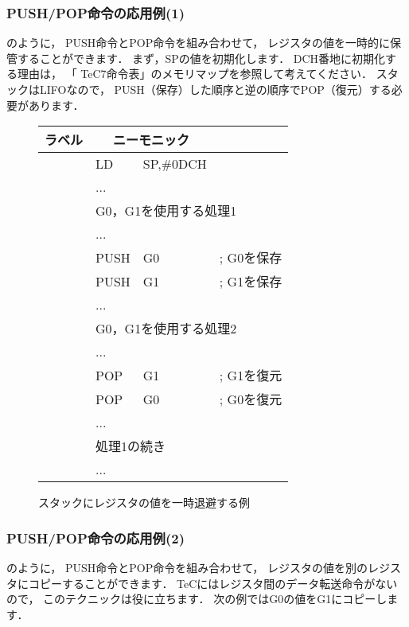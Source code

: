 \subsubsection{PUSH/POP命令の応用例(1)}
のように，
PUSH命令とPOP命令を組み合わせて，
レジスタの値を一時的に保管することができます．
まず，SPの値を初期化します．
DCH番地に初期化する理由は，
「 TeC7命令表」のメモリマップを参照して考えてください．
スタックはLIFOなので，
PUSH（保存）した順序と逆の順序でPOP（復元）する必要があります．

\begin{figure}[bt]
{\tt\small\begin{center}
\begin{tabular}{|l|l l l|}
\hline
ラベル & \multicolumn{2}{|c}{ニーモニック} & \\
\hline
    & LD   & SP,\#0DCH&            \\
    & ...  &          &            \\
    & \multicolumn{3}{|l|}{G0，G1を使用する処理1} \\
    & ...  &          &            \\
    & PUSH & G0       & ; G0を保存 \\
    & PUSH & G1       & ; G1を保存 \\
    & ...  &        & \\
    & \multicolumn{3}{|l|}{G0，G1を使用する処理2} \\
    & ...  &          &            \\
    & POP  & G1       & ; G1を復元 \\
    & POP  & G0       & ; G0を復元 \\
    & ...  &        & \\
    & \multicolumn{3}{|l|}{処理1の続き} \\
    & ...  &          &            \\
\hline
\end{tabular}
\end{center}}
\caption{スタックにレジスタの値を一時退避する例}
\label{fig:chap6:regsave}
\end{figure}

\subsubsection{PUSH/POP命令の応用例(2)}
のように，
PUSH命令とPOP命令を組み合わせて，
レジスタの値を別のレジスタにコピーすることができます．
TeCにはレジスタ間のデータ転送命令がないので，
このテクニックは役に立ちます．
次の例ではG0の値をG1にコピーします．

